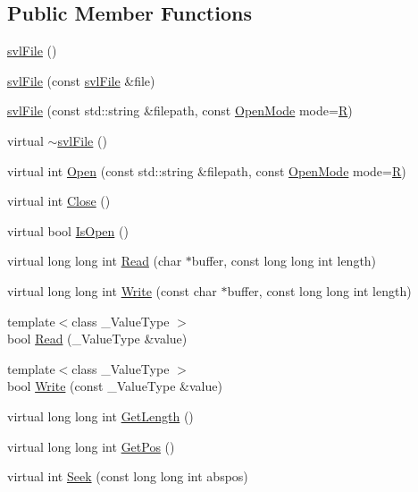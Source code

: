 \subsection*{Public Member Functions}
\begin{DoxyCompactItemize}
\item 
\hyperlink{classsvl_file_a3bf2cd56dbbb1503e4a85289d9fa20d3}{svl\-File} ()
\item 
\hyperlink{classsvl_file_a092ae18727d1b6b95ce8e08297ce7309}{svl\-File} (const \hyperlink{classsvl_file}{svl\-File} \&file)
\item 
\hyperlink{classsvl_file_a537ab837bf88a0f8db65661a700c65ec}{svl\-File} (const std\-::string \&filepath, const \hyperlink{classsvl_file_a457656e908091234c3b92e11596ae1eb}{Open\-Mode} mode=\hyperlink{classsvl_file_a457656e908091234c3b92e11596ae1ebafe4e2c50609d24167be9c0c276c0c6c2}{R})
\item 
virtual \hyperlink{classsvl_file_a11bb01c4178002babdd83bb308222cb6}{$\sim$svl\-File} ()
\item 
virtual int \hyperlink{classsvl_file_ab433e010e565a684b6767dc3ab8f16cf}{Open} (const std\-::string \&filepath, const \hyperlink{classsvl_file_a457656e908091234c3b92e11596ae1eb}{Open\-Mode} mode=\hyperlink{classsvl_file_a457656e908091234c3b92e11596ae1ebafe4e2c50609d24167be9c0c276c0c6c2}{R})
\item 
virtual int \hyperlink{classsvl_file_a94d17e1c028e00296adae1006976abd5}{Close} ()
\item 
virtual bool \hyperlink{classsvl_file_a72f2b30878e3e55d5c6c987b2d4eb959}{Is\-Open} ()
\item 
virtual long long int \hyperlink{classsvl_file_a84cb50a2e47f112fa7b7cd24532e6661}{Read} (char $\ast$buffer, const long long int length)
\item 
virtual long long int \hyperlink{classsvl_file_af4517b3f890e9b56686b1e31728ada17}{Write} (const char $\ast$buffer, const long long int length)
\item 
{\footnotesize template$<$class \-\_\-\-Value\-Type $>$ }\\bool \hyperlink{classsvl_file_ab60935c3bcfaa69e07332059b3ab9a13}{Read} (\-\_\-\-Value\-Type \&value)
\item 
{\footnotesize template$<$class \-\_\-\-Value\-Type $>$ }\\bool \hyperlink{classsvl_file_abed84f5285fa5052a219d198fc5a2e0a}{Write} (const \-\_\-\-Value\-Type \&value)
\item 
virtual long long int \hyperlink{classsvl_file_a9ccc4b30233d9619c9c59e275f13e47b}{Get\-Length} ()
\item 
virtual long long int \hyperlink{classsvl_file_af846b5c2d9afff7e0112bdab62a1ea5d}{Get\-Pos} ()
\item 
virtual int \hyperlink{classsvl_file_ac7c60953728feb139668ce0e1ba7daff}{Seek} (const long long int abspos)
\end{DoxyCompactItemize}


